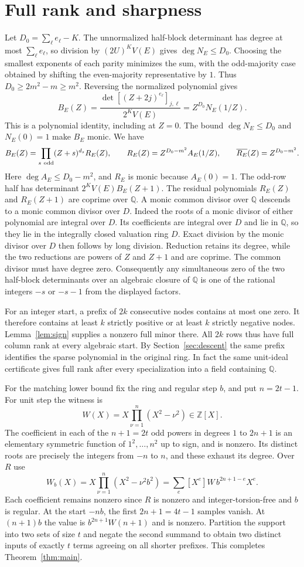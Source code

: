 \documentclass[10pt]{article}
\newcommand{\Z}{\mathbb Z}
\newcommand{\Q}{\mathbb Q}
\begin{document}
\section{Full rank and sharpness}\label{sec:full}
Let $D_0=\sum_\ell e_\ell-K$. The unnormalized half-block determinant
has degree at most $\sum_\ell e_\ell$, so division by $(2U)^K V(E)$
gives $\deg N_E\le D_0$. Choosing the smallest exponents of each
parity minimizes the sum, with the odd-majority case obtained by
shifting the even-majority representative by $1$. Thus
$D_0\ge 2m^2-m\ge m^2$. Reversing the normalized polynomial gives
\[
 B_E(Z)=\frac{\det[(Z+2j)^{e_\ell}]_{j,\ell}}{2^K V(E)}
       = Z^{D_0}N_E(1/Z).
\]
This is a polynomial identity, including at $Z=0$.
The bound $\deg N_E\le D_0$ and $N_E(0)=1$ make $B_E$ monic.
We have
\[
 B_E(Z)=\prod_{s\ {\rm odd}}(Z+s)^{d_s}R_E(Z),
 \qquad
 R_E(Z)=Z^{D_0-m^2}A_E(1/Z),
 \qquad \overline{R_E}(Z)=Z^{D_0-m^2}.
\]
Here $\deg A_E\le D_0-m^2$, and $R_E$ is monic because $A_E(0)=1$.
The odd-row half has determinant $2^K V(E)B_E(Z+1)$.
The residual polynomials $R_E(Z)$ and $R_E(Z+1)$ are coprime over
$\Q$. A monic common divisor over $\Q$ descends to a monic common
divisor over $D$. Indeed the roots of a monic divisor of either
polynomial are integral over $D$. Its coefficients are integral
over $D$ and lie in $\Q$, so they lie in the integrally closed
valuation ring $D$. Exact division by the monic divisor over $D$
then follows by long division. Reduction retains its degree, while
the two reductions are powers of $Z$ and $Z+1$ and are coprime.
The common divisor must have degree zero. Consequently any
simultaneous zero of the two
half-block determinants over an algebraic closure of $\Q$ is one
of the rational integers $-s$ or $-s-1$ from the displayed factors.

For an integer start, a prefix of $2k$ consecutive nodes contains
at most one zero. It therefore contains at least $k$ strictly positive
or at least $k$ strictly negative nodes. Lemma~\ref{lem:sign} supplies
a nonzero full minor there. All $2k$ rows thus have full column rank
at every algebraic start. By Section~\ref{sec:descent} the same
prefix identifies the sparse polynomial in the original ring.
In fact the same unit-ideal certificate gives full rank after every
specialization into a field containing $\Q$.

For the matching lower bound fix the ring and regular step $b$, and put
$n=2t-1$. For unit step the witness is
\[
 W(X)=X\prod_{\nu=1}^{n}(X^2-\nu^2)\in\Z[X].
\]
The coefficient in each of the $n+1=2t$ odd powers in degrees $1$ to
$2n+1$ is an elementary symmetric function of $1^2,\ldots,n^2$ up to
sign, and is nonzero. Its distinct roots are precisely the integers
from $-n$ to $n$, and these exhaust its degree. Over $R$ use
\[
 W_b(X)=X\prod_{\nu=1}^{n}(X^2-\nu^2 b^2)
       =\sum_e [X^e]W \, b^{2n+1-e}X^e.
\]
Each coefficient remains nonzero since $R$ is nonzero and
integer-torsion-free and $b$ is regular. At the start $-nb$, the first
$2n+1=4t-1$ samples vanish. At $(n+1)b$ the value is
$b^{2n+1}W(n+1)$ and is nonzero. Partition the support into
two sets of size $t$ and negate the second summand to obtain two
distinct inputs of exactly $t$ terms agreeing on all shorter prefixes.
This completes Theorem~\ref{thm:main}.
\end{document}

